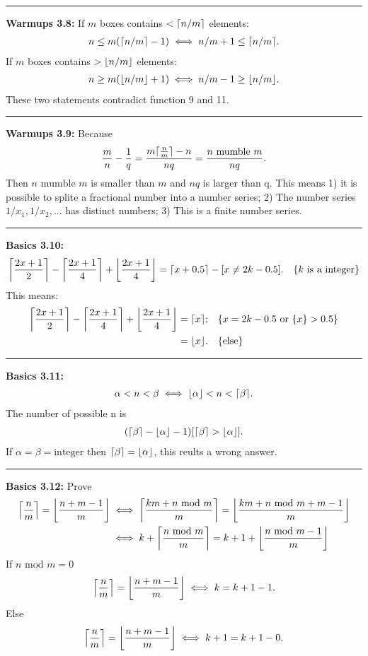 \documentclass{article}
\DeclarePairedDelimiter\ceil{\lceil}{\rceil}
\DeclarePairedDelimiter\floor{\lfloor}{\rfloor}
\begin{document}
\noindent\rule{\textwidth}{0.4pt}
\textbf{Warmups 3.8:}
If $m$ boxes contains $ < \ceil{n/m}$ elements:
\begin{align}
n \le m (\ceil{n/m} - 1) \iff n/m + 1 \le \ceil{n/m}.
\end{align}
If $m$ boxes contains $ > \floor{n/m}$ elements:
\begin{align}
n \ge m (\floor{n/m} + 1) \iff n/m - 1 \ge \floor{n/m}.
\end{align}
These two statements contradict function 9 and 11.

\noindent\rule{\textwidth}{0.4pt}
\textbf{Warmups 3.9:}
Because
\begin{align}
\frac{m}{n} - \frac{1}{q} = \frac{m \ceil{\frac{n}{m}}-n}{nq} = \frac{n \text{ mumble } m}{nq}.
\end{align}
Then $n \text{ mumble } m$ is smaller than $m$ and $nq$ is larger than q.
This means 1) it is possible to splite a fractional number into a number series;
2) The number series $1/x_1,1/x_2,...$ has distinct numbers;
3) This is a finite number series.

\noindent\rule{\textwidth}{0.4pt}
\textbf{Basics 3.10:}
\begin{align}
\ceil*{\frac{2x + 1}{2}} - \ceil*{\frac{2x + 1}{4}} + \floor*{\frac{2x + 1}{4}} = \ceil{x + 0.5} - [x \neq 2k-0.5]. && \{k \text{ is a integer}\}
\end{align}
This means:
\begin{align}
\ceil*{\frac{2x + 1}{2}} - \ceil*{\frac{2x + 1}{4}} + \floor*{\frac{2x + 1}{4}} &= \ceil{x}; && \{x = 2k-0.5 \text{ or } \{x\}>0.5\} \\
										&= \floor{x}. && \{\text{else}\}
\end{align}

\noindent\rule{\textwidth}{0.4pt}
\textbf{Basics 3.11:}
\begin{align}
\alpha < n < \beta \iff \floor{\alpha} < n < \ceil{\beta}.
\end{align}
The number of possible n is
\begin{align}
(\ceil{\beta} - \floor{\alpha} - 1)[\ceil{\beta} > \floor{\alpha}].
\end{align}
If $\alpha = \beta = \text{integer}$ then $\ceil{\beta} = \floor{\alpha}$, this reults a wrong answer.

\noindent\rule{\textwidth}{0.4pt}
\textbf{Basics 3.12:}
Prove
\begin{align}
\ceil*{\frac{n}{m}} = \floor*{\frac{n+m-1}{m}} &\iff \ceil*{\frac{km + n\text{ mod } m}{m}} = \floor*{\frac{km + n\text{ mod } m +m-1}{m}} \\
					       &\iff k + \ceil*{\frac{n\text{ mod } m}{m}} = k + 1 + \floor*{\frac{ n\text{ mod } m -1}{m}} \\
\end{align}
If $n \text{ mod } m = 0$
\begin{align}
\ceil*{\frac{n}{m}} = \floor*{\frac{n+m-1}{m}} \iff k = k + 1 - 1.
\end{align}
Else
\begin{align}
\ceil*{\frac{n}{m}} = \floor*{\frac{n+m-1}{m}} \iff k + 1 = k + 1 - 0.
\end{align}
\end{document}
